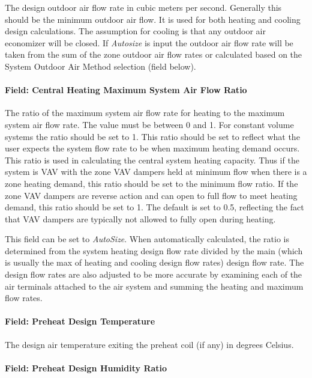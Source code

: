 The design outdoor air flow rate in cubic meters per second. Generally this should be the minimum outdoor air flow. It is used for both heating and cooling design calculations. The assumption for cooling is that any outdoor air economizer will be closed. If \emph{Autosize} is input the outdoor air flow rate will be taken from the sum of the zone outdoor air flow rates or calculated based on the System Outdoor Air Method selection (field below).

\paragraph{Field: Central Heating Maximum System Air Flow Ratio}\label{field-central-heating-maximum-system-air-flow-ratio}

The ratio of the maximum system air flow rate for heating to the maximum system air flow rate. The value must be between 0 and 1. For constant volume systems the ratio should be set to 1. This ratio should be set to reflect what the user expects the system flow rate to be when maximum heating demand occurs. This ratio is used in calculating the central system heating capacity. Thus if the system is VAV with the zone VAV dampers held at minimum flow when there is a zone heating demand, this ratio should be set to the minimum flow ratio. If the zone VAV dampers are reverse action and can open to full flow to meet heating demand, this ratio should be set to 1. The default is set to 0.5, reflecting the fact that VAV dampers are typically not allowed to fully open during heating.

This field can be set to \emph{AutoSize}.  When automatically calculated, the ratio is determined from the system heating design flow rate divided by the main (which is usually the max of heating and cooling design flow rates) design flow rate.  The design flow rates are also adjusted to be more accurate by examining each of the air terminals attached to the air system and summing the heating and maximum flow rates.

\paragraph{Field: Preheat Design Temperature}\label{field-preheat-design-temperature}

The design air temperature exiting the preheat coil (if any) in degrees Celsius.

\paragraph{Field: Preheat Design Humidity Ratio}\label{field-preheat-design-humidity-ratio}

